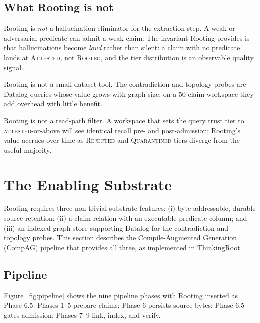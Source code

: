 \documentclass[10pt,a4paper]{article}
\begin{document}
\subsection{What Rooting is not}
\label{sec:rooting-not}

Rooting is \emph{not} a hallucination eliminator for the extraction step.
A weak or adversarial predicate can admit a weak claim. The invariant
Rooting provides is that hallucinations become \emph{loud} rather than
silent: a claim with no predicate lands at \textsc{Attested}, not
\textsc{Rooted}, and the tier distribution is an observable quality
signal.

Rooting is not a small-dataset tool. The contradiction and topology probes
are Datalog queries whose value grows with graph size; on a 50-claim
workspace they add overhead with little benefit.

Rooting is not a read-path filter. A workspace that sets the query trust
tier to \textsc{attested}-or-above will see identical recall pre- and
post-admission; Rooting's value accrues over time as \textsc{Rejected} and
\textsc{Quarantined} tiers diverge from the useful majority.

\section{The Enabling Substrate}
\label{sec:substrate}

Rooting requires three non-trivial substrate features: (i) byte-addressable,
durable source retention; (ii) a claim relation with an executable-predicate
column; and (iii) an indexed graph store supporting Datalog for the
contradiction and topology probes. This section describes the
Compile-Augmented Generation (CompAG) pipeline that provides all three, as
implemented in ThinkingRoot.

\subsection{Pipeline}

Figure~\ref{fig:pipeline} shows the nine pipeline phases with Rooting
inserted as Phase 6.5. Phases 1--5 prepare claims; Phase 6 persists source
bytes; Phase 6.5 gates admission; Phases 7--9 link, index, and verify.
\end{document}

